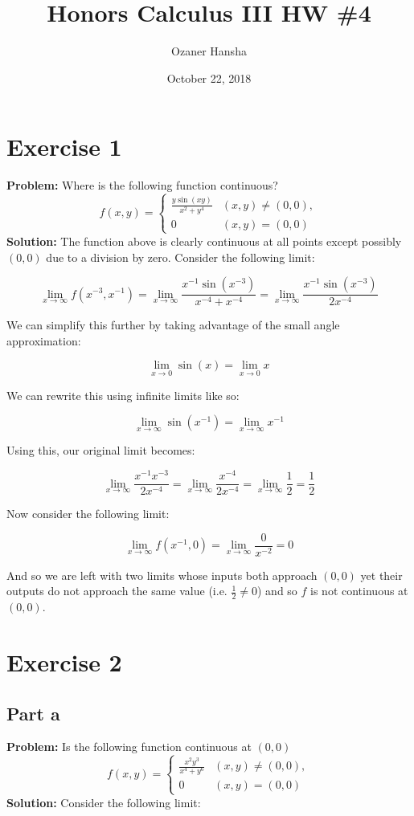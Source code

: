 \documentclass{article}
\begin{document}
\title{Honors Calculus III HW \#4}
\author{Ozaner Hansha}
\date{October 22, 2018}
\maketitle

\section*{Exercise 1}
\textbf{Problem:} Where is the following function continuous?
$$f(x,y)=\begin{cases}
          \frac{y\sin(xy)}{x^2+y^4} & (x,y)\not=(0,0), \\
          0 & (x,y)=(0,0)
          \end{cases}$$
\textbf{Solution:} The function above is clearly continuous at all points except possibly $(0,0)$ due to a division by zero. Consider the following limit:

$$\lim_{x\to\infty}f(x^{-3},x^{-1})=\lim_{x\to\infty}\frac{x^{-1}\sin(x^{-3})}{x^{-4}+x^{-4}}=\lim_{x\to\infty}\frac{x^{-1}\sin(x^{-3})}{2x^{-4}}$$

We can simplify this further by taking advantage of the small angle approximation:

$$\lim_{x\to 0}\sin(x)=\lim_{x\to 0}x$$

We can rewrite this using infinite limits like so:

$$\lim_{x\to\infty}\sin(x^{-1})=\lim_{x\to\infty}x^{-1}$$

Using this, our original limit becomes:

$$\lim_{x\to\infty}\frac{x^{-1}x^{-3}}{2x^{-4}}=\lim_{x\to\infty}\frac{x^{-4}}{2x^{-4}}=\lim_{x\to\infty}\frac{1}{2}=\frac{1}{2}$$

Now consider the following limit:

$$\lim_{x\to\infty}f(x^{-1},0)=\lim_{x\to\infty}\frac{0}{x^{-2}}=0$$

And so we are left with two limits whose inputs both approach $(0,0)$ yet their outputs do not approach the same value (i.e. $\frac{1}{2}\not= 0$) and so $f$ is not continuous at $(0,0)$.

\section*{Exercise 2}
\subsection*{Part a}
\textbf{Problem:} Is the following function continuous at $(0,0)$
$$f(x,y)=\begin{cases}
          \frac{x^2y^3}{x^4+y^6} & (x,y)\not=(0,0), \\
          0 & (x,y)=(0,0)
          \end{cases}$$
\textbf{Solution:} Consider the following limit:
\end{document}
